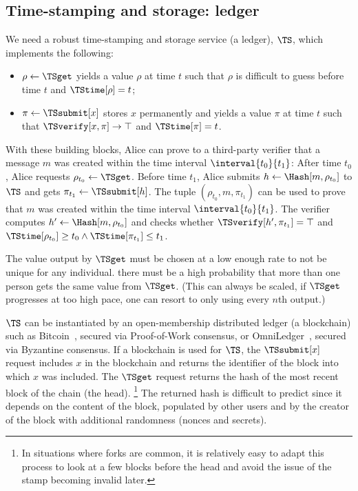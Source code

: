 \subsection{Time-stamping and storage: ledger}%
\label{StorageProperties}\label{timestamp}\label{ledger}

We need a robust time-stamping and storage service (\ie a ledger), \(\TS\), 
which implements the following:
\begin{itemize}
  \item \(\rho \gets \TSget\) yields a value \(\rho\) at time \(t\) such that 
    \(\rho\) is difficult to guess before time \(t\) and \(\TStime[\rho] = t\);
  \item \(\pi\gets \TSsubmit[x]\) stores \(x\) permanently and yields a value 
    \(\pi\) at time \(t\) such that \(\TSverify[x, \pi]\to \top\) and 
    \(\TStime[\pi] = t\).
\end{itemize}

With these building blocks, Alice can prove to a third-party verifier that a 
message \(m\) was created within the time interval \(\interval{t_0}{t_1}\):
After time \(t_0\), Alice requests \(\rho_{t_0}\gets \TSget\).
Before time \(t_1\), Alice submits \(h\gets \Hash[m, \rho_{t_0}]\) to \(\TS\) 
and gets \(\pi_{t_1}\gets \TSsubmit[h]\).
The tuple \((\rho_{t_0}, m, \pi_{t_1})\) can be used to prove that \(m\) was 
created within the time interval \(\interval{t_0}{t_1}\).
The verifier computes \(h'\gets \Hash[m, \rho_{t_0}]\) and checks whether 
\(\TSverify[h', \pi_{t_1}] = \top\) and \(\TStime[\rho_{t_0}] \geq t_0\land 
  \TStime[\pi_{t_1}] \leq t_1\).

The value output by \(\TSget\) must be chosen at a low enough rate to not be 
unique for any individual.
\Ie there must be a high probability that more than one person gets the same 
value from \(\TSget\).
(This can always be scaled, if \(\TSget\) progresses at too high pace, one can 
resort to only using every \(n\)th output.)

\(\TS\) can be instantiated by an open-membership distributed ledger (\eg a blockchain) such as Bitcoin~\cite{Bitcoin}, secured via Proof-of-Work consensus, or OmniLedger~\cite{OmniLedger}, secured via Byzantine consensus.
If a blockchain is used for \(\TS\), the \(\TSsubmit[x]\) request includes 
\(x\) in the blockchain and returns the identifier of the block into which 
\(x\) was included.
The \(\TSget\) request returns the hash of the most recent block of the chain 
(\ie the head).%
\footnote{In situations where forks are common, it is relatively easy to adapt this process to look at a few blocks before the head and avoid the issue of the stamp becoming invalid later.}
The returned hash is difficult to predict since it depends on the content of the block, populated by other users and by the creator of the block with additional randomness (\eg nonces and secrets).

